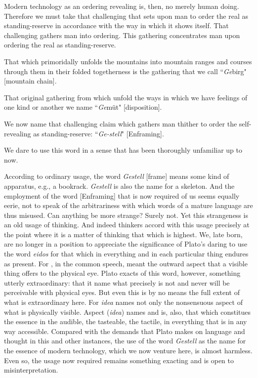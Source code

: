 Modern technology as an ordering revealing is, then, no merely human doing. Therefore we must take that challenging that sets upon man to order the real as standing-reserve in accordance with the way in which it shows itself. That challenging gathers man into ordering. This gathering concentrates man upon ordering the real as standing-reserve.

That which primoridally unfolds the mountains into mountain ranges and courses through them in their folded togetherness is the gathering that we call ``\textit{Ge}birg" [mountain chain].

That original gathering from which unfold the ways in which we have feelings of one kind or another we name ``\textit{Ge}m\"{u}t" [disposition].

We now name that challenging claim which gathers man thither to order the self-revealing as standing-reserve: ``\textit{Ge-stell}" [Enframing].

We dare to use this word in a sense that has been thoroughly unfamiliar up to now.

According to ordinary usage, the word \textit{Gestell} [frame] means some kind of apparatus, e.g., a bookrack. \textit{Gestell} is also the name for a skeleton. And the employment of the word  [Enframing] that is now required of us seems equally eerie, not to speak of the arbitrariness with which words of a mature language are thus misused. Can anything be more strange? Surely not. Yet this strangeness is an old usage of thinking. And indeed thinkers accord with this usage precisely at the point where it is a matter of thinking that which is highest. We, late born, are no longer in a position to appreciate the significance of Plato's daring to use the word \textit{eidos} for that which in everything and in each particular thing endures as present. For , in the common speech, meant the outward aspect that a visible thing offers to the physical eye. Plato exacts of this word, however, something utterly extraordinary: that it name what precisely is not and never will be perceivable with physical eyes. But even this is by no means the full extent of what is extraordinary here. For \textit{idea} names not only the nonsensuous aspect of what is physically visible. Aspect (\textit{idea}) names and is, also, that which constitues the essence in the audible, the tasteable, the tactile, in everything that is in any way accessible. Compared with the demands that Plato makes on language and thought in this and other instances, the use of the word \textit{Gestell} as the name for the essence of modern technology, which we now venture here, is almost harmless. Even so, the usage now required remains something exacting and is open to misinterpretation.

